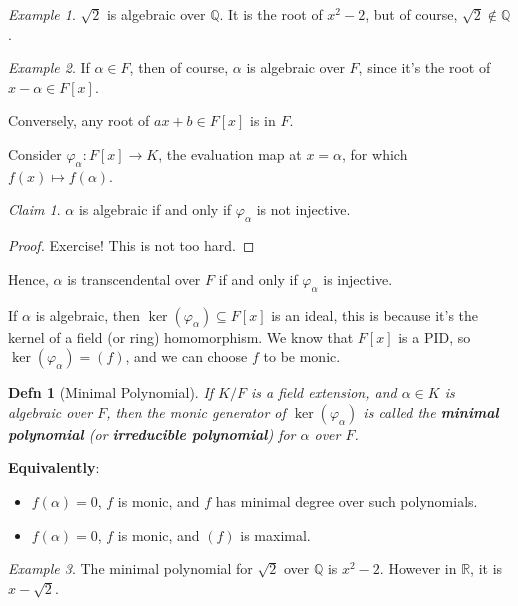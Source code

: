\documentclass[12pt]{article}
\def\Q{{\mathbb Q}}
\def\R{{\mathbb R}}
\newtheorem{definition}{Defn}
\theoremstyle{remark}
\theoremstyle{remark}
\newtheorem{claim}{Claim}
\theoremstyle{remark}
\newtheorem{example}{Example}
\theoremstyle{remark}
\theoremstyle{remark}
\begin{document}
\begin{example}
  $\sqrt{2}$ is algebraic over $\Q$. It is the root of $x^2 - 2$, but of course,
  $\sqrt{2} \not\in \Q$.
\end{example}

\begin{example}
  If $\alpha \in F$, then of course, $\alpha$ is algebraic over $F$, since it's
  the root of $x - \alpha \in F[x]$.

  Conversely, any root of $ax + b \in F[x]$ is in $F$.
\end{example}

Consider $\varphi_{\alpha} : F[x] \to K$, the evaluation map at $x = \alpha$,
for which $f(x) \mapsto f(\alpha)$.

\begin{claim}
  $\alpha$ is algebraic if and only if $\varphi_{\alpha}$ is not injective.
\end{claim}

\begin{proof}
  Exercise! This is not too hard.
\end{proof}

Hence, $\alpha$ is transcendental over $F$ if and only if $\varphi_{\alpha}$ is
injective.

If $\alpha$ is algebraic, then $\ker(\varphi_{\alpha}) \subseteq F[x]$ is an
ideal, this is because it's the kernel of a field (or ring) homomorphism. We
know that $F[x]$ is a PID, so $\ker(\varphi_{\alpha}) = (f)$, and we can choose
$f$ to be monic.

\begin{definition}[Minimal Polynomial]
  If $K / F$ is a field extension, and $\alpha \in K$ is algebraic over $F$,
  then the monic generator of $\ker(\varphi_{\alpha})$ is called the {\bf
  minimal polynomial} (or {\bf irreducible polynomial}) for $\alpha$ over $F$.
\end{definition}

{\bf Equivalently}: 
\begin{itemize}
  \item $f(\alpha) = 0$, $f$ is monic, and $f$ has minimal degree over such polynomials.
  \item $f(\alpha) = 0$, $f$ is monic, and $(f)$ is maximal.
\end{itemize}

\begin{example}
  The minimal polynomial for $\sqrt{2}$ over $\Q$ is $x^2 - 2$. However in $\R$,
  it is $x - \sqrt{2}$.
\end{example}
\end{document}
